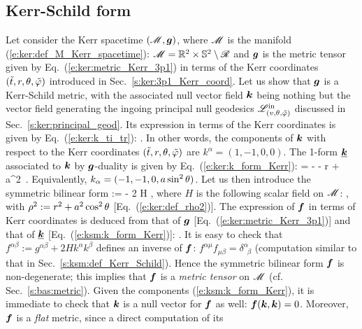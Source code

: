 \subsection{Kerr-Schild form}

Let consider the Kerr spacetime $(\mathscr{M},\bm{g})$, where $\mathscr{M}$ is the manifold
(\ref{e:ker:def_M_Kerr_spacetime}): $\mathscr{M} = \mathbb{R}^2\times\mathbb{S}^2 \setminus \mathscr{R}$
and $\bm{g}$ is the metric tensor given by Eq.~(\ref{e:ker:metric_Kerr_3p1})
in terms of the Kerr coordinates $({\tilde t}, r, \theta,{\tilde\varphi})$ introduced in
Sec.~\ref{s:ker:3p1_Kerr_coord}.
Let us show that $\bm{g}$ is a Kerr-Schild metric, with the associated null vector
field $\bm{k}$ being nothing but the vector field generating the
ingoing principal null geodesics $\mathscr{L}^{\rm in}_{(v,\theta,{\tilde\varphi})}$  discussed in Sec.~\ref{s:ker:principal_geod}.
Its expression in terms of the Kerr coordinates is given by Eq.~(\ref{e:ker:k_ti_tr}):
\be \label{e:ksm:k_Kerr}
     .
\ee
In other words, the components of $\bm{k}$ with respect to the Kerr coordinates $({\tilde t}, r, \theta,{\tilde\varphi})$ are $k^\alpha = (1, -1, 0, 0)$.
The 1-form $\underline{\bm{k}}$ associated to $\bm{k}$ by $\bm{g}$-duality is
given by Eq.~(\ref{e:ker:k_form_Kerr}):
\be \label{e:ksm:k_form_Kerr}
     = - \dd \ti - \dd r + a\sin^2\th \, \dd\tph .
\ee
Equivalently, $k_\alpha = (-1, -1, 0, a\sin^2\theta)$.
Let us then introduce the symmetric bilinear form
\be
     :=  - 2 H  \otimes {} ,
\ee
where $H$ is the following scalar field on $\mathscr{M}$:
\be \label{e:ksm:H_Kerr}
   ,
\ee
with $\rho^2 := r^2 + a^2 \cos^2\theta$ [Eq.~(\ref{e:ker:def_rho2})].
The expression of $\bm{f}$ in terms of Kerr coordinates is deduced
from that of $\bm{g}$ [Eq.~(\ref{e:ker:metric_Kerr_3p1})] and that of
$\underline{\bm{k}}$ [Eq.~(\ref{e:ksm:k_form_Kerr})]:
\be \label{e:ksm:f_Kerr}
  .
\ee
It is easy to check that $f^{\alpha\beta} := g^{\alpha\beta} + 2 H k^\alpha k^\beta$
defines an inverse of $\bm{f}$: $f^{\alpha\mu} f_{\mu\beta} = \delta^\alpha_{\ \; \beta}$
(computation similar to that in Sec.~\ref{s:ksm:def_Kerr_Schild}). Hence the
symmetric bilinear form $\bm{f}$ is non-degenerate; this implies that $\bm{f}$
is a \emph{metric tensor} on $\mathscr{M}$ (cf. Sec.~\ref{s:bas:metric}).
Given the components (\ref{e:ksm:k_form_Kerr}), it is immediate to check that $\bm{k}$ is a null vector for $\bm{f}$ as well: $\bm{f}(\bm{k}, \bm{k}) = 0$.
Moreover, $\bm{f}$ is a \emph{flat} metric, since a direct computation of its
